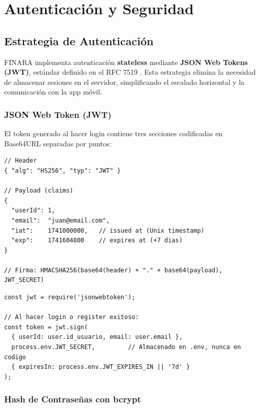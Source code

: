 \chapter{Autenticación y Seguridad}

\section{Estrategia de Autenticación}

FINARA implementa autenticación \textbf{stateless} mediante \textbf{JSON Web Tokens (JWT)}, estándar definido en el RFC 7519 \cite{jwt_rfc}. Esta estrategia elimina la necesidad de almacenar sesiones en el servidor, simplificando el escalado horizontal y la comunicación con la app móvil.

\subsection{JSON Web Token (JWT)}

El token generado al hacer login contiene tres secciones codificadas en Base64URL separadas por puntos:

\begin{lstlisting}[style=json, caption={Estructura del JWT generado por FINARA}]
// Header
{ "alg": "HS256", "typ": "JWT" }

// Payload (claims)
{
  "userId": 1,
  "email":  "juan@email.com",
  "iat":    1741000000,   // issued at (Unix timestamp)
  "exp":    1741604800    // expires at (+7 dias)
}

// Firma: HMACSHA256(base64(header) + "." + base64(payload), JWT_SECRET)
\end{lstlisting}

\begin{lstlisting}[style=javascript, caption={Generación del token JWT en authController.js}]
const jwt = require('jsonwebtoken');

// Al hacer login o register exitoso:
const token = jwt.sign(
  { userId: user.id_usuario, email: user.email },
  process.env.JWT_SECRET,         // Almacenado en .env, nunca en codigo
  { expiresIn: process.env.JWT_EXPIRES_IN || '7d' }
);
\end{lstlisting}

\subsection{Hash de Contraseñas con bcrypt}

